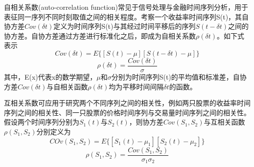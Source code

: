 \documentclass[12pt]{article}
\begin{document}
自相关系数(auto-correlation function)常见于信号处理与金融时间序列分析，用于表征同一序列不同时刻取值之间的相关程度。考察一个收益率时间序列S(t)，其自协方差$Cov(\delta t)$定义为时间序列S(t)与其经过时间平移后的序列$S(t-\delta t)$之间的协方差。自协方差通过方差进行标准化之后，即成为自相关系数$\rho(\delta t)$。如下式表示 $$Cov(\delta t)=E\{[S(t)-\mu][S(t-\delta t)-\mu]\}$$ $$\rho(\delta t)=\frac{Cov(\delta t)}{\sigma}$$
其中，E(x)代表x的数学期望，$\mu$和$\sigma$分别为时间序列S(t)的平均值和标准差，自协方差$Cov(\delta t)$与自相关函数$\rho(\delta t)$均为平移时间间隔$\delta t$的函数。

互相关系数可应用于研究两个不同序列之间的相关性，例如两只股票的收益率时间序列之间的相关性、同一只股票的价格时间序列与交易量时间序列之间的相关性。
假设两个时间序列分别为$S_1(t)$与$S_2(t)$，则协方差$Cov(S_1,S_2)$与互相关函数$\rho(S_1,S_2)$分别定义为 $$COv(S_1,S_2)=E\{[S_1(t)-\mu_1][S_2(t)-\mu_2]\}$$
$$\rho(S_1,S_2)=\frac{Cov(S_1,S_2)}{\sigma_1 \sigma_2}$$

 



\end{document}
